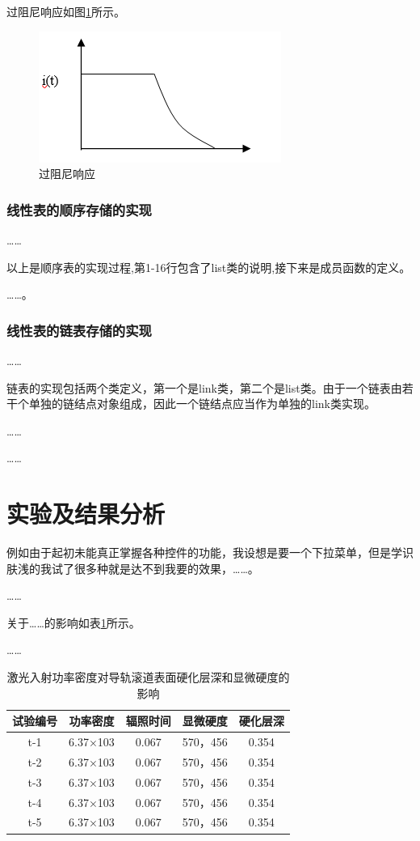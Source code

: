 \documentclass[supercite]{upcthesis}
\begin{document}
过阻尼响应如图\ref{guozuni}所示。
\begin{figure}[htbp]
\centering

\includegraphics{./figure/guozuni.png}
\caption{过阻尼响应}
\label{guozuni}
\end{figure}
\subsubsection{线性表的顺序存储的实现}
……

以上是顺序表的实现过程,第1-16行包含了list类的说明,接下来是成员函数的定义。

……。
\subsubsection{线性表的链表存储的实现}
……

链表的实现包括两个类定义，第一个是link类，第二个是list类。由于一个链表由若干个单独的链结点对象组成，因此一个链结点应当作为单独的link类实现。

……

……

\section{实验及结果分析}
例如由于起初未能真正掌握各种控件的功能，我设想是要一个下拉菜单，但是学识肤浅的我试了很多种就是达不到我要的效果，……。

……

关于……的影响如表\ref{data_table}所示。

……

\begin{table}[htbp]
	\small
	\newcommand{\tabincell}[2]{\begin{tabular}{@{}#1@{}}#2\end{tabular}} 
	\centering
	\caption{激光入射功率密度对导轨滚道表面硬化层深和显微硬度的影响}
	\begin{tabular}{ccccc}
		\toprule
		试验编号 & 功率密度 & 辐照时间 & 显微硬度 	& 硬化层深\\ \midrule
		t-1	&6.37×103	&0.067	&570，456	&0.354\\
		t-2	&6.37×103	&0.067	&570，456	&0.354\\
		t-3	&6.37×103	&0.067	&570，456	&0.354\\
		t-4	&6.37×103	&0.067	&570，456	&0.354\\
		t-5	&6.37×103	&0.067	&570，456	&0.354\\ \bottomrule
	\end{tabular}
	\label{data_table}
\end{table}
\end{document}

